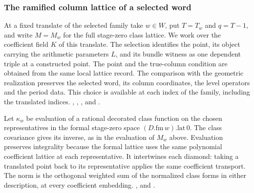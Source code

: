 \subsubsection{The ramified column lattice of a selected word}
\label{sec:selected-ramified-donor}

At a fixed translate of the selected family take \(w\in W\), put
\(T=T_w\) and \(q=T-1\), and write \(M=M_w\) for the full
stage-zero class lattice. We work over the coefficient field \(K\)
of this translate. The selection identifies the point, its object
carrying the arithmetic parameters \(L\), and its bundle witness as
one dependent triple at a constructed point. The point and the
true-column condition are obtained from the same local lattice
record. The comparison with the geometric realization preserves
the selected word, its column coordinates, the level operators and
the period data. This choice is available at each index of the
family, including the translated indices.
,
,
,
 and
.

Let \(\kappa_w\) be evaluation of a rational decorated class
function on the chosen representatives in the formal stage-zero
space \((D.\mathrm{fm}\,w).\mathrm{lat}\,0\).
The class covariance gives its inverse, as in the evaluation of
\(M_w\) above. Evaluation preserves integrality because the
formal lattice uses the same polynomial coefficient lattice
at each representative. It intertwines each diamond: taking
a translated point back to its representative applies the same
coefficient transport. The norm is the orthogonal weighted sum
of the normalized class forms in either description, at every
coefficient embedding.
,
 and
.

